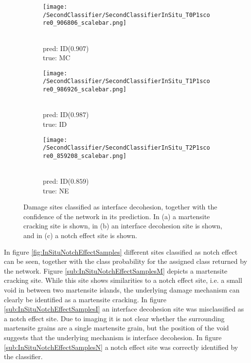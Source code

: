 \begin{figure}[H]
\centering
\begin{subfigure}{0.3\textwidth}
\texttt{[image: /SecondClassifier/SecondClassifierInSitu\_T0P1score0\_906806\_scalebar.png]}
\caption{\\pred: ID($0.907$) \\ true: MC}
\label{sub:InSituInterfaceDecohesionSamplesM}
\end{subfigure}
\begin{subfigure}{0.3\textwidth}
\texttt{[image: /SecondClassifier/SecondClassifierInSitu\_T1P1score0\_986926\_scalebar.png]}
\caption{\\pred: ID($0.987$) \\ true: ID}
\label{sub:InSituInterfaceDecohesionSamplesID}
\end{subfigure}
\begin{subfigure}{0.3\textwidth}
\texttt{[image: /SecondClassifier/SecondClassifierInSitu\_T2P1score0\_859208\_scalebar.png]}
\caption{\\pred: ID($0.859$) \\ true: NE}
\label{sub:InSituInterfaceDecohesionSamplesN}
\end{subfigure}
\caption{Damage sites classified as interface decohesion, together with the confidence of the network in its prediction. In (a) a martensite cracking site is shown, in (b) an interface decohesion site is shown, and in (c) a notch effect site is shown. }
\label{fig:InSituInterfaceDecohesionSamples}
\end{figure}

In figure \ref{fig:InSituNotchEffectSamples} different sites classified as notch effect can be seen, together with the class probability for the assigned class returned by the network. Figure \ref{sub:InSituNotchEffectSamplesM} depicts a martensite cracking site. While this site shows similarities to a notch effect site, i.e. a small void in between two martensite islands, the underlying damage mechanism can clearly be identified as a martensite cracking. In figure \ref{sub:InSituNotchEffectSamplesI} an interface decohesion site was misclassified as a notch effect site. Due to imaging it is not clear whether the surrounding martensite grains are a single martensite grain, but the position of the void suggests that the underlying mechanism is interface decohesion. In figure \ref{sub:InSituNotchEffectSamplesN} a notch effect site was correctly identified by the classifier. \\

